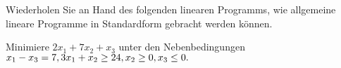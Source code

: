 
\begin{exercise}

Wiederholen Sie an Hand des folgenden linearen Programms, wie allgemeine lineare
Programme in Standardform gebracht werden können.



\begin{adjustwidth}{4cm}{}
Minimiere $2x_1 + 7x_2 + x_3$ unter den Nebenbedingungen \\
  $x_1 - x_3 = 7, \\
  3x_1 + x_2 \geq 24, \\
  x_2 \geq 0, \\
  x_3 \leq 0.$
\end{adjustwidth}

\end{exercise}



\begin{solution}

\phantom{}

\end{solution}

